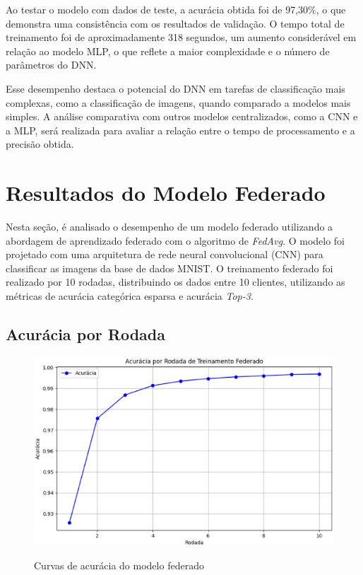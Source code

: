 Ao testar o modelo com dados de teste, a acurácia obtida foi de 97,30\%, o que demonstra uma consistência com os resultados de validação. O tempo total de treinamento foi de aproximadamente 318 segundos, um aumento considerável em relação ao modelo MLP, o que reflete a maior complexidade e o número de parâmetros do DNN.

Esse desempenho destaca o potencial do DNN em tarefas de classificação mais complexas, como a classificação de imagens, quando comparado a modelos mais simples. A análise comparativa com outros modelos centralizados, como a CNN e a MLP, será realizada para avaliar a relação entre o tempo de processamento e a precisão obtida.

\section{Resultados do Modelo Federado}

Nesta seção, é analisado o desempenho de um modelo federado utilizando a abordagem de aprendizado federado com o algoritmo de \textit{FedAvg}. O modelo foi projetado com uma arquitetura de rede neural convolucional (CNN) para classificar as imagens da base de dados MNIST. O treinamento federado foi realizado por 10 rodadas, distribuindo os dados entre 10 clientes, utilizando as métricas de acurácia categórica esparsa e acurácia \textit{Top-3}.

\subsection{Acurácia por Rodada}

\begin{figure}[ht]
    \centering
    \caption{Curvas de acurácia do modelo federado}
    \includegraphics[scale=0.4]{figuras/analiseResultados/acuracyFederated.eps}
    \label{fig:acuracyFederated}
\end{figure}

